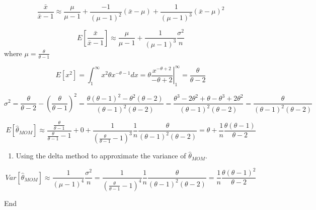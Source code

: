 \documentclass[]{article}
\newenvironment{Shaded}{\begin{snugshade}}{\end{snugshade}}
\newcommand{\NormalTok}[1]{#1}
\providecommand{\tightlist}{%
  \setlength{\itemsep}{0pt}\setlength{\parskip}{0pt}}
\begin{document}
\[\frac{\bar x}{\bar x-1}\approx \frac{\mu}{\mu-1}+\frac{-1}{(\mu-1)^2}(\bar x-\mu)+\frac{1}{(\mu-1)^3}(\bar x-\mu)^2\]

\[E[\frac{\bar x}{\bar x-1}]\approx \frac{\mu}{\mu-1}+\frac{1}{(\mu-1)^3}\frac{\sigma^2}n\]
where \(\mu=\frac\theta{\theta-1}\)

\[E[x^2]=\int_1^{\infty}x^2\theta x^{-\theta-1}dx=\left.\theta\frac{x^{-\theta+2}}{-\theta+2}\right|_1^{\infty}=\frac\theta{\theta-2}\]

\[\sigma^2=\frac\theta{\theta-2}-(\frac\theta{\theta-1})^2=\frac{\theta(\theta-1)^2-\theta^2(\theta-2)}{(\theta-1)^2(\theta-2)}=\frac{\theta^3-2\theta^2+\theta-\theta^3+2\theta^2}{(\theta-1)^2(\theta-2)}=\frac{\theta}{(\theta-1)^2(\theta-2)}\]

\[E[\hat\theta_{MOM}]\approx \frac{\frac\theta{\theta-1}}{\frac\theta{\theta-1}-1}+0+\frac{1}{(\frac\theta{\theta-1}-1)^3}\frac1n\frac{\theta}{(\theta-1)^2(\theta-2)}=\theta+\frac1n\frac{\theta(\theta-1)}{\theta-2}\]

\begin{enumerate}
\def\labelenumi{\alph{enumi}.}
\setcounter{enumi}{2}
\tightlist
\item
  \textcolor[rgb]{0.5,0.5,0.5}{Using the delta method to approximate the variance of $\hat\theta_{MOM}$.}
\end{enumerate}

\[Var[\hat\theta_{MOM}]\approx \frac{1}{(\mu-1)^4}\frac{\sigma^2}n=\frac{1}{(\frac\theta{\theta-1}-1)^4}\frac1n\frac{\theta}{(\theta-1)^2(\theta-2)}=\frac1n\frac{\theta(\theta-1)^2}{\theta-2}\]

\begin{Shaded}
\begin{Highlighting}[]
\NormalTok{End}
\end{Highlighting}
\end{Shaded}
\end{document}
